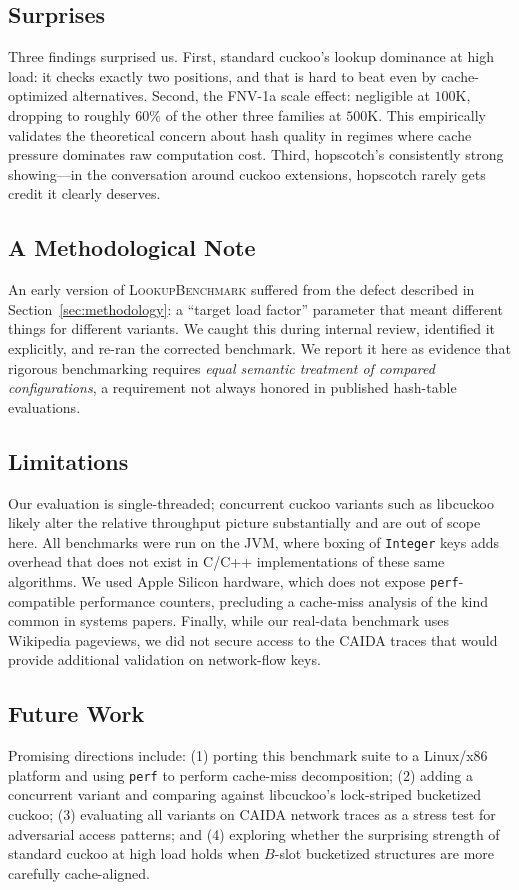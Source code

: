 \documentclass[10pt,journal,compsoc]{IEEEtran}
\begin{document}
\subsection{Surprises}
Three findings surprised us. First, standard cuckoo's lookup dominance at high load: it checks exactly two positions, and that is hard to beat even by cache-optimized alternatives. Second, the FNV-1a scale effect: negligible at $100\mathrm{K}$, dropping to roughly $60\%$ of the other three families at $500\mathrm{K}$. This empirically validates the theoretical concern about hash quality in regimes where cache pressure dominates raw computation cost. Third, hopscotch's consistently strong showing---in the conversation around cuckoo extensions, hopscotch rarely gets credit it clearly deserves.

\subsection{A Methodological Note}
An early version of \textsc{LookupBenchmark} suffered from the defect described in Section~\ref{sec:methodology}: a ``target load factor'' parameter that meant different things for different variants. We caught this during internal review, identified it explicitly, and re-ran the corrected benchmark. We report it here as evidence that rigorous benchmarking requires \emph{equal semantic treatment of compared configurations}, a requirement not always honored in published hash-table evaluations.

\subsection{Limitations}
Our evaluation is single-threaded; concurrent cuckoo variants such as libcuckoo~\cite{li2014libcuckoo} likely alter the relative throughput picture substantially and are out of scope here. All benchmarks were run on the JVM, where boxing of \texttt{Integer} keys adds overhead that does not exist in C/C++ implementations of these same algorithms. We used Apple Silicon hardware, which does not expose \texttt{perf}-compatible performance counters, precluding a cache-miss analysis of the kind common in systems papers. Finally, while our real-data benchmark uses Wikipedia pageviews, we did not secure access to the CAIDA traces that would provide additional validation on network-flow keys.

\subsection{Future Work}
Promising directions include: (1) porting this benchmark suite to a Linux/x86 platform and using \texttt{perf} to perform cache-miss decomposition; (2) adding a concurrent variant and comparing against libcuckoo's lock-striped bucketized cuckoo; (3) evaluating all variants on CAIDA network traces as a stress test for adversarial access patterns; and (4) exploring whether the surprising strength of standard cuckoo at high load holds when $B$-slot bucketized structures are more carefully cache-aligned.
\end{document}
